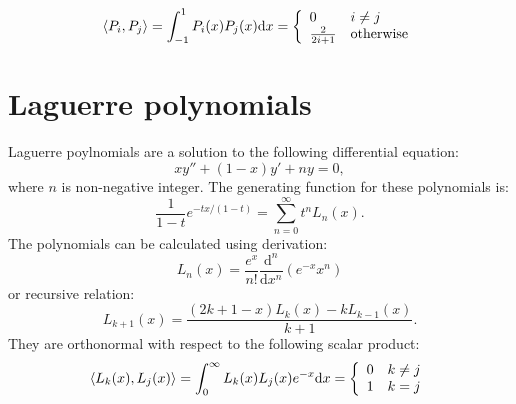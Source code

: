 \documentclass[openany, longbibliography,slovene,a4paper,12pt]{article}
\newcommand{\dif}{\mathrm{d}}
\begin{document}
\[   \braket{P_i, P_j}=\int_{-1}^{1} P_i(x) P_j(x) \dif x=
  \left\{
\begin{array}{ll}
      0 & i\neq j \\
      \frac{2}{2i+1} & \mathrm{otherwise} \\
\end{array} 
\right. \]


\section{Laguerre polynomials}
Laguerre poylnomials are a solution to the following differential equation:
\begin{equation}
  xy'' + (1-x)y'+ny=0,
  \end{equation}
where $n$ is non-negative integer. The generating function for these polynomials
is:
\begin{equation}
  \frac{1}{1-t}e^{-tx/(1-t)}=\sum_{n=0}^\infty t^nL_n(x).
  \end{equation}
  The polynomials can be calculated using derivation:
  \begin{equation}
    L_n(x)=\frac{e^x}{n!}\frac{\dif^n}{\dif x^n}\left(e^{-x}x^n \right)
    \end{equation}
    or recursive relation:
    \begin{equation}
      L_{k+1}(x)=\frac{(2k+1-x)L_k(x)-kL_{k-1}(x)}{k+1}.
    \end{equation}
    They are orthonormal with respect to the following scalar product:
    \[
      \braket{L_k(x), L_j(x)}= \int_0^\infty L_k(x)L_j(x)e^{-x} \dif x =
        \left\{
\begin{array}{ll}
      0 & k\neq j \\
      1 & k=j \\
\end{array} 
\right.
\]
\end{document}
